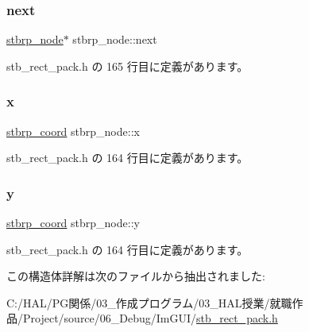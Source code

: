\subsubsection{\texorpdfstring{next}{next}}
{\footnotesize\ttfamily \mbox{\hyperlink{structstbrp__node}{stbrp\+\_\+node}}$\ast$ stbrp\+\_\+node\+::next}



 stb\+\_\+rect\+\_\+pack.\+h の 165 行目に定義があります。

\mbox{\label{structstbrp__node_a45ab31a88025db27d08040d715b129ea}} 
\subsubsection{\texorpdfstring{x}{x}}
{\footnotesize\ttfamily \mbox{\hyperlink{stb__rect__pack_8h_ac2c2491b95dea6a298b7423dc762dfd9}{stbrp\+\_\+coord}} stbrp\+\_\+node\+::x}



 stb\+\_\+rect\+\_\+pack.\+h の 164 行目に定義があります。

\mbox{\label{structstbrp__node_ad0415cb102a4f37aa45073653307e67e}} 
\subsubsection{\texorpdfstring{y}{y}}
{\footnotesize\ttfamily \mbox{\hyperlink{stb__rect__pack_8h_ac2c2491b95dea6a298b7423dc762dfd9}{stbrp\+\_\+coord}} stbrp\+\_\+node\+::y}



 stb\+\_\+rect\+\_\+pack.\+h の 164 行目に定義があります。



この構造体詳解は次のファイルから抽出されました\+:\begin{DoxyCompactItemize}
\item 
C\+:/\+H\+A\+L/\+P\+G関係/03\+\_\+作成プログラム/03\+\_\+\+H\+A\+L授業/就職作品/\+Project/source/06\+\_\+\+Debug/\+Im\+G\+U\+I/\mbox{\hyperlink{stb__rect__pack_8h}{stb\+\_\+rect\+\_\+pack.\+h}}\end{DoxyCompactItemize}
